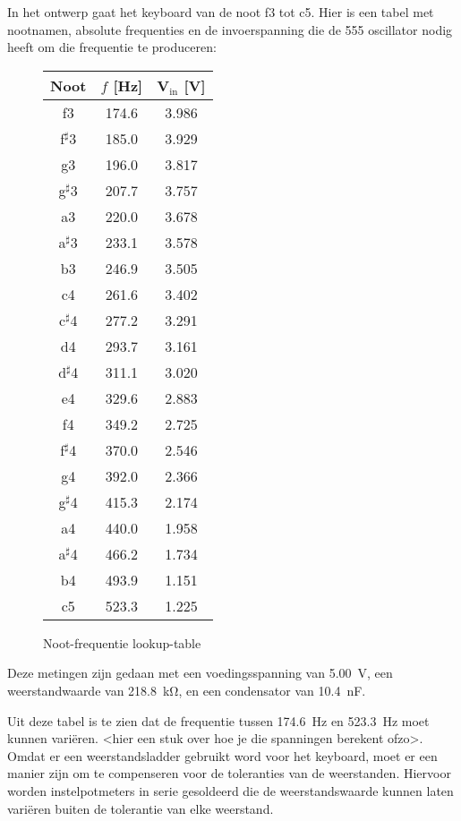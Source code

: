 \documentclass[12pt, a4paper, dutch]{article}
\newcommand{\s}{$^{\sharp}$}
\newcommand{\sub}[1]{$_{\text{#1}}$}
\begin{document}
In het ontwerp gaat het keyboard van de noot f3 tot c5. Hier is een tabel met
nootnamen, absolute frequenties en de invoerspanning die de 555 oscillator nodig
heeft om die frequentie te produceren:

\begin{figure}[H]
\centering
\begin{tabular}{ccc}
\toprule
Noot & $f$ [\si{\hertz}] & V\sub{in} [\si{\volt}]\\
\midrule
f3   & \num{174.6} & \num{3.986} \\
f\s3 & \num{185.0} & \num{3.929} \\
g3   & \num{196.0} & \num{3.817} \\
g\s3 & \num{207.7} & \num{3.757} \\
a3   & \num{220.0} & \num{3.678} \\
a\s3 & \num{233.1} & \num{3.578} \\
b3   & \num{246.9} & \num{3.505} \\
c4   & \num{261.6} & \num{3.402} \\
c\s4 & \num{277.2} & \num{3.291} \\
d4   & \num{293.7} & \num{3.161} \\
d\s4 & \num{311.1} & \num{3.020} \\
e4   & \num{329.6} & \num{2.883} \\
f4   & \num{349.2} & \num{2.725} \\
f\s4 & \num{370.0} & \num{2.546} \\
g4   & \num{392.0} & \num{2.366} \\
g\s4 & \num{415.3} & \num{2.174} \\
a4   & \num{440.0} & \num{1.958} \\
a\s4 & \num{466.2} & \num{1.734} \\
b4   & \num{493.9} & \num{1.151} \\
c5   & \num{523.3} & \num{1.225} \\
\bottomrule
\end{tabular}
\caption{Noot-frequentie lookup-table}
\end{figure}

Deze metingen zijn gedaan met een voedingsspanning van \SI{5.00}{\volt}, een
weerstandwaarde van \SI{218.8}{\kilo\ohm}, en een condensator van
\SI{10.4}{\nano\farad}.

Uit deze tabel is te zien dat de frequentie tussen \SI{174.6}{\hertz} en
\SI{523.3}{\hertz} moet kunnen vari\"eren. <hier een stuk over hoe je die spanningen
berekent ofzo>. Omdat er een weerstandsladder gebruikt word voor het keyboard, moet
er een manier zijn om te compenseren voor de toleranties van de weerstanden. Hiervoor
worden instelpotmeters in serie gesoldeerd die de weerstandswaarde kunnen laten
vari\"eren buiten de tolerantie van elke weerstand.
\end{document}
